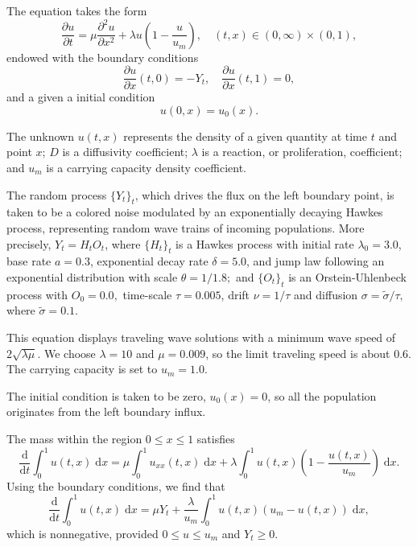 \documentclass[reqno,12pt]{amsart}
\theoremstyle{plain} %
\theoremstyle{definition} %
\begin{document}
The equation takes the form
\begin{equation}
    \label{fisherkpprode}
    \frac{\partial u}{\displaystyle \partial t} = \mu\frac{\partial^2 u}{\partial x^2} + \lambda u\left(1 - \frac{u}{u_m}\right), \quad (t, x) \in (0, \infty) \times (0, 1),
\end{equation}
endowed with the boundary conditions
\begin{equation}
    \label{fisherkppbc}
    \frac{\partial u}{\partial x}(t, 0) = - Y_t, \quad \frac{\partial u}{\partial x}(t, 1) = 0,
\end{equation}
and a given a initial condition
\[
   u(0, x) = u_0(x).
\]

The unknown $u(t, x)$ represents the density of a given quantity at time $t$ and point $x$; $D$ is a diffusivity coefficient; $\lambda$ is a reaction, or proliferation, coefficient; and $u_m$ is a carrying capacity density coefficient.

The random process $\{Y_t\}_t$, which drives the flux on the left boundary point, is taken to be a colored noise modulated by an exponentially decaying Hawkes process, representing random wave trains of incoming populations. More precisely, $Y_t = H_t O_t$, where $\{H_t\}_t$ is a Hawkes process with initial rate $\lambda_0 = 3.0$, base rate $a = 0.3$, exponential decay rate $\delta = 5.0$, and jump law following an exponential distribution with scale $\theta = 1/1.8;$ and $\{O_t\}_t$ is an Orstein-Uhlenbeck process with $O_0 = 0.0,$ time-scale $\tau = 0.005$, drift $\nu = 1/\tau$ and diffusion $\sigma = \tilde \sigma/\tau,$ where $\tilde\sigma = 0.1.$

This equation displays traveling wave solutions with a minimum wave speed of $2 \sqrt{\lambda \mu}$. We choose $\lambda = 10$ and $\mu= 0.009$, so the limit traveling speed is about $0.6$. The carrying capacity is set to $u_m = 1.0$.

The initial condition is taken to be zero, $u_0(x) = 0$, so all the population originates from the left boundary influx.

The mass within the region $0\leq x \leq 1$ satisfies
\[
   \frac{\mathrm{d}}{\mathrm{d} t} \int_0^1 u(t, x) \;\mathrm{d}x = \mu\int_0^1 u_{xx}(t, x) \;\mathrm{d}x + \lambda \int_0^1 u(t, x)\left(1 - \frac{u(t, x)}{u_m}\right)\;\mathrm{d}x.
\]
Using the boundary conditions, we find that
\[
   \frac{\mathrm{d}}{\mathrm{d}t} \int_0^1 u(t, x) \;\mathrm{d}x = \mu Y_t  + \frac{\lambda}{u_m} \int_0^1 u(t, x)\left(u_m - u(t, x)\right)\;\mathrm{d}x,
\]
which is nonnegative, provided $0 \leq u \leq u_m$ and $Y_t \geq 0$.
\end{document}
